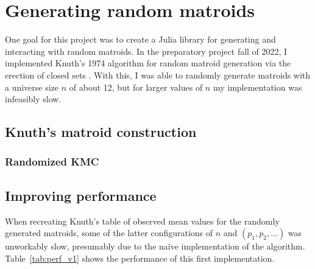 \chapter{Generating random matroids}

One goal for this project was to create a Julia library for generating and interacting with random matroids. In the preparatory project fall of 2022, I implemented Knuth's 1974 algorithm for random matroid generation via the erection of closed sets \cite{knuth-1975}. With this, I was able to randomly generate matroids with a universe size $n$ of about 12, but for larger values of $n$ my implementation was infeasibly slow.

\section{Knuth's matroid construction}
\skelpars[6]

\subsection{Randomized KMC}
\skelpars[3]

\section{Improving performance}
When recreating Knuth's table of observed mean values for the randomly generated matroids, some of the latter configurations of $n$ and $(p_1, p_2, \ldots)$ was unworkably slow, presumably due to the naïve implementation of the algorithm. Table~\ref{tab:perf_v1} shows the performance of this first implementation.

